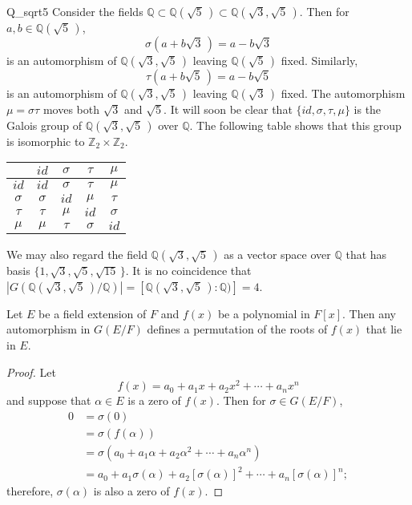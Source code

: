 \begin{example}{Q_sqrt5}
Consider the fields ${\mathbb Q} \subset {\mathbb Q}(\sqrt{5}\, ) \subset {\mathbb Q}( \sqrt{3}, \sqrt{5}\, )$.  Then for $a, b \in {\mathbb Q}( \sqrt{5}\, )$,
\[
\sigma( a + b \sqrt{3}\, ) = a - b \sqrt{3}
\]
is an automorphism of ${\mathbb Q}(\sqrt{3}, \sqrt{5}\, )$ leaving ${\mathbb Q}( \sqrt{5}\, )$ fixed.  Similarly,
\[
\tau( a + b \sqrt{5}\, ) = a - b \sqrt{5}
\]
is an automorphism of ${\mathbb Q}(\sqrt{3}, \sqrt{5}\, )$ leaving ${\mathbb Q}( \sqrt{3}\, )$ fixed. The automorphism $\mu = \sigma \tau$ moves both $\sqrt{3}$ and $\sqrt{5}$.  It will soon be clear that $\{ id, \sigma, \tau, \mu  \}$ is the Galois group of ${\mathbb Q}(\sqrt{3}, \sqrt{5}\, )$ over ${\mathbb Q}$. The following table shows that this group is isomorphic to ${\mathbb Z}_2 \times {\mathbb Z}_2$.  
\begin{center}
\begin{tabular}{c|cccc}
   & $id$ & $\sigma$ & $\tau$ & $\mu$ \\
\hline
$id$  & $id$ & $\sigma$ & $\tau$ & $\mu$ \\
$\sigma$ & $\sigma$ & $id$ & $\mu$ & $\tau$ \\
$\tau$ & $\tau$ & $\mu$ & $id$ & $\sigma$ \\
$\mu$ & $\mu$ & $\tau$ & $\sigma$ & $id$
\end{tabular}
\end{center}
We may also regard the field ${\mathbb Q}( \sqrt{3}, \sqrt{5}\, )$ as a vector space over ${\mathbb Q}$ that has basis $\{ 1, \sqrt{3}, \sqrt{5}, \sqrt{15}\, \}$.  It is no coincidence that $|G( {\mathbb Q}( \sqrt{3},
\sqrt{5}\, ) /{\mathbb Q})| = [{\mathbb Q}(\sqrt{3}, \sqrt{5}\, ):{\mathbb Q})] = 4$.
\end{example} 
 
\begin{proposition}\label{galois:roots_permute_prop}
Let $E$ be a field extension of $F$ and $f(x)$ be a polynomial in $F[x]$. Then any automorphism in $G(E/F)$ defines a permutation of the roots of $f(x)$ that lie in $E$. 
\end{proposition}
 
\begin{proof}
Let 
\[
f(x) = a_0 + a_1 x + a_2 x^2 + \cdots + a_n x^n
\]
and suppose that $\alpha \in E$ is a zero of $f(x)$. Then for $\sigma \in G(E/F)$,
\begin{align*}
0 & = \sigma( 0 ) \\
& = \sigma( f( \alpha )) \\
& = \sigma(a_0 + a_1\alpha + a_2 \alpha^2 + \cdots + a_n \alpha^n) \\
& = a_0 + a_1 \sigma(\alpha) + a_2 [\sigma(\alpha)]^2 + \cdots + a_n
[\sigma(\alpha)]^n;
\end{align*} 
therefore, $\sigma( \alpha )$ is also a zero of $f(x)$.
\end{proof}

